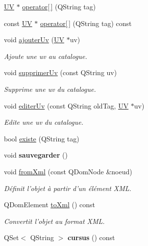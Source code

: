 \begin{DoxyCompactItemize}
\item 
\hyperlink{classUV}{U\+V} $\ast$ \hyperlink{classCatalogue_a0b41015c9bdedce5463c077e4f5911d9}{operator\mbox{[}$\,$\mbox{]}} (Q\+String tag)
\item 
const \hyperlink{classUV}{U\+V} $\ast$ \hyperlink{classCatalogue_ad3c0bd9f62e5dfac1793a38b28b0eb7d}{operator\mbox{[}$\,$\mbox{]}} (Q\+String tag) const 
\item 
void \hyperlink{classCatalogue_aaa115ae803e70505a8c1973dc77ed16e}{ajouter\+Uv} (\hyperlink{classUV}{U\+V} $\ast$uv)
\begin{DoxyCompactList}\small\item\em Ajoute une uv au catalogue. \end{DoxyCompactList}\item 
void \hyperlink{classCatalogue_aac46b55131756fab4116334f40e2db08}{supprimer\+Uv} (const Q\+String uv)
\begin{DoxyCompactList}\small\item\em Supprime une uv du catalogue. \end{DoxyCompactList}\item 
void \hyperlink{classCatalogue_ad57d112222cd659ce25e4c1f2a656a37}{editer\+Uv} (const Q\+String old\+Tag, \hyperlink{classUV}{U\+V} $\ast$uv)
\begin{DoxyCompactList}\small\item\em Edite une uv du catalogue. \end{DoxyCompactList}\item 
bool \hyperlink{classCatalogue_aa09bcaa689f5c1a99b2938eb207fcb53}{existe} (Q\+String tag)
\item 
\hypertarget{classCatalogue_a5041850ff2105de5cc0a60bd81428f29}{void {\bfseries sauvegarder} ()}\label{classCatalogue_a5041850ff2105de5cc0a60bd81428f29}

\item 
\hypertarget{classCatalogue_a0a8e893d0f54ca2ce1583758c5b6cf05}{void \hyperlink{classCatalogue_a0a8e893d0f54ca2ce1583758c5b6cf05}{from\+Xml} (const Q\+Dom\+Node \&noeud)}\label{classCatalogue_a0a8e893d0f54ca2ce1583758c5b6cf05}

\begin{DoxyCompactList}\small\item\em Définit l'objet à partir d'un élément X\+M\+L. \end{DoxyCompactList}\item 
Q\+Dom\+Element \hyperlink{classCatalogue_a12f412e8ba3dd8b950fc1f7dd8608f51}{to\+Xml} () const 
\begin{DoxyCompactList}\small\item\em Convertit l'objet au format X\+M\+L. \end{DoxyCompactList}\item 
\hypertarget{classCatalogue_ad474a13f9542c20894560310b75f431c}{Q\+Set$<$ Q\+String $>$ {\bfseries cursus} () const }\label{classCatalogue_ad474a13f9542c20894560310b75f431c}


\end{DoxyCompactItemize}
